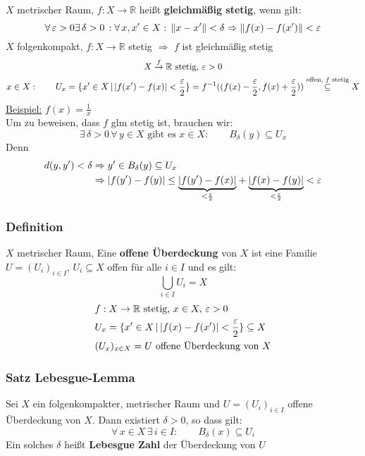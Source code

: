$X$ metrischer Raum, $f:X \to \mathbb{R}$ heißt {\bfseries gleichmäßig stetig}, wenn gilt:
\[
	\forall\, \varepsilon>0 \exists\, \delta >0 \,: \forall\, x,x' \in X: \, \norm{x-x'}<\delta \Rightarrow \norm{f(x)-f(x')}<\varepsilon
\]
$X$ folgenkompakt, $f:X \to \mathbb{R}$ stetig $\Rightarrow $ $f$ ist gleichmäßig stetig
\begin{gather*}
	X \stackrel{f}{\to} \mathbb{R} \text{ stetig, } \varepsilon>0 \\
	x \in X: \qquad U_x = \{x' \in X \,|\,\lvert f(x')-f(x)\rvert< \frac{\varepsilon}{2} \} = f^{-1}((f(x)-\frac{\varepsilon}{2},f(x)+\frac{\varepsilon}{2})) 
	\stackrel{\text{offen, $f$ stetig}}{\subseteq } X
\end{gather*}
\underline{Beispiel:} $f(x)=\frac{1}{x}$ \\
Um zu beweisen, dass $f$ glm stetig ist, brauchen wir:
\[
	\exists\, \delta >0 \,\forall\, y \in X \text{ gibt es } x \in X: \qquad B_{\delta}(y)\subseteq U_x 
\]
Denn 
\begin{align*}
	d(y,y')<\delta &\Rightarrow y' \in B_{\delta}(y) \subseteq U_x \\
					& \Rightarrow  \lvert f(y')-f(y)\rvert \leq \underset{<\frac{\varepsilon}{2}}{\underbrace{\lvert f(y')-f(x)\rvert}} +
					 \underset{<\frac{\varepsilon}{2}}{\underbrace{\lvert f(x)-f(y)\rvert}} < \varepsilon
\end{align*}
 \subsubsection{Definition} %
 \label{ssub:definition}
 $X$ metrischer Raum, Eine {\bfseries offene Überdeckung} von $X$ ist eine Familie $U=(U_i)_{i \in I}$, $U_i \subseteq X$ offen für alle $i \in I$ und es gilt:
 \[
 	\bigcup\limits_{i \in I}U_i = X
 \]
 \begin{align*}
 	&f:X \to \mathbb{R} \text{ stetig, } x \in X, \,\varepsilon>0 \\
	&U_x = \{ x' \in X \,|\,\lvert f(x)-f(x')\rvert< \frac{\varepsilon}{2} \} \subseteq X \\
	&(U_x)_{x \in X} = U \text{ offene Überdeckung von }X
 \end{align*}
 \subsubsection{Satz Lebesgue-Lemma} %
 \label{ssub:satz_lebesgue_lemma}
 Sei $X$ ein folgenkompakter, metrischer Raum und $U=(U_i)_{i \in I}$ offene Überdeckung von $X$. Dann existiert $\delta >0$, so dass gilt:
 \[
 	\forall\, x \in X \, \exists\,i \in I: \qquad B_{\delta}(x)\subseteq U_i
 \]
 Ein solches $\delta$ heißt {\bfseries Lebesgue Zahl} der Überdeckung von $U$
 
